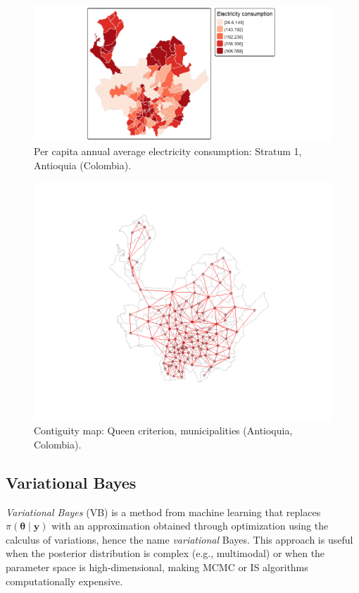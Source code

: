 \begin{figure}[!h]
	\centering
	\includegraphics[width=340pt]{Chapters/chapter15/figures/AntMap.png}
	\caption[List of figure caption goes here]{Per capita annual average electricity consumption: Stratum 1, Antioquia (Colombia).}
	\label{FigINLAmap1}
\end{figure}

\begin{figure}[!h]
	\includegraphics[width=340pt]{Chapters/chapter15/figures/AntMapCont.png}
	\caption[List of figure caption goes here]{Contiguity map: Queen criterion, municipalities (Antioquia, Colombia).}\label{FigINLAmap2}
\end{figure} 


\subsection{Variational Bayes}\label{sec15_22}
\textit{Variational Bayes} (VB) is a method from machine learning \cite{jordan1999introduction, wainwright2008graphical} that replaces $\pi(\boldsymbol{\theta} \mid \mathbf{y})$ with an approximation obtained through optimization using the calculus of variations, hence the name \textit{variational} Bayes. This approach is useful when the posterior distribution is complex (e.g., multimodal) or when the parameter space is high-dimensional, making MCMC or IS algorithms computationally expensive.

